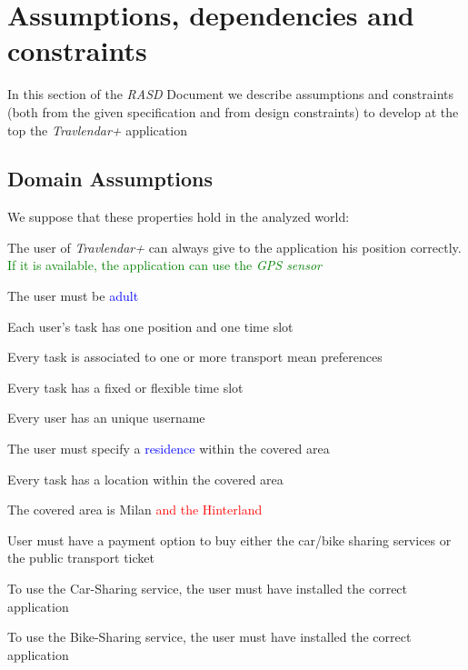 \section{Assumptions, dependencies and constraints}
In this section of the \emph{RASD} Document we describe assumptions and constraints (both from the given specification and from design constraints) to develop at the top the \emph{Travlendar+} application

\subsection{Domain Assumptions}
We suppose that these properties hold in the analyzed world:
\begin{domainList}

\item The user of \emph{Travlendar+} can always give to the application his position correctly. \textcolor{green}{If it is available, the application can use the \it GPS sensor}

\item The user must be \textcolor{blue}{adult}

\item Each user's task has one position and one time slot

\item Every task is associated to one or more transport mean preferences

\item Every task has a fixed or flexible time slot

\item Every user has an unique username

\item The user must specify a \textcolor{blue}{residence} within the covered area

\item Every task has a location within the covered area

\item The covered area is Milan \textcolor{red}{ and the Hinterland}

\item User must have a payment option to buy either the car/bike sharing services or the public transport ticket

\item To use the Car-Sharing service, the user must have installed the correct application

\item To use the Bike-Sharing service, the user must have installed the correct application


\end{domainList}
